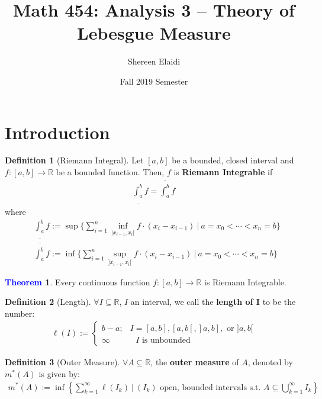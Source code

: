\documentclass[reqno,11pt]{amsart}
\title{\textbf{Math 454: Analysis 3 -- Theory of Lebesgue Measure}\vspace{-2ex}}
\author{Shereen Elaidi\vspace{-2ex}}
\date{Fall 2019 Semester}
\theoremstyle{definition}
\newcommand{\bb}[1]{\mathbb{#1}}
\newtheorem{theorem}{\textcolor{blue}{Theorem}}
\theoremstyle{definition}
\newtheorem{definition}{\textcolor{OliveGreen}{Definition}}
\theoremstyle{remark}
\newcommand{\upRiemannint}[2]{
  \overline{\int_{#1}^{#2}}
}
\newcommand{\loRiemannint}[2]{
  \underline{\int_{#1}^{#2}}
}
\begin{document}
\maketitle 



\section{Introduction}

\begin{definition}[Riemann Integral]
	Let $[a,b]$ be a bounded, closed interval and $f: [a, b] \rightarrow \bb{R}$ be a bounded function. Then, $f$ is \textbf{Riemann Integrable} if 
	\begin{align}
		\loRiemannint{a}{b} f = \upRiemannint{a}{b} f
	\end{align}
	where
	\begin{align}
		& \loRiemannint{a}{b} f := \sup \bigg\{ 	\sum_{i=1}^n \inf_{]x_{i-1}, x_i[} f \cdot (x_i - x_{i-1} )\ \bigg|\ a = x_0 < \cdots < x_n =b		\bigg\}  \\
		& \upRiemannint{a}{b} f := \inf \bigg\{ 	\sum_{i=1}^n \sup_{]x_{i-1}, x_i[} f \cdot (x_i - x_{i-1} )\ \bigg|\ a = x_0 < \cdots < x_n =b		\bigg\} 	
	\end{align}
\end{definition}

\begin{theorem}
	Every continuous function $f: [a,b] \rightarrow \bb{R}$ is Riemann Integrable. 
\end{theorem}

\begin{definition}[Length]
	$\forall I \subseteq \bb{R}$, $I$ an interval, we call the \textbf{length of I} to be the number: 
	\begin{align}
		\ell(I):= \begin{cases}
			b-a;  & I = [a,b], [a,b[, ]a, b], \mbox{ or } ]a,b[ \\
			\infty &  \mbox{ $I$ is unbounded } 
		\end{cases}
	\end{align}
\end{definition}

\begin{definition}[Outer Measure]
	$\forall A \subseteq \bb{R}$, the \textbf{outer measure} of $A$, denoted by $m^*(A)$ is given by: 
	\begin{align}
		m^*(A) := \inf \left\{ 	\sum_{k=1}^\infty \ell(I_k)\ \bigg|\ (I_k) \mbox{ open, bounded intervals s.t. } A \subseteq \bigcup_{k=1}^\infty I_k		\right\} 
	\end{align}
\end{definition}
\end{document}
